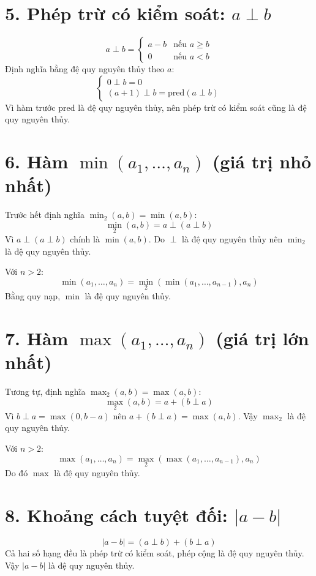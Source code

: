 \documentclass[12pt,a4paper]{article}
\begin{document}
\section*{5. Phép trừ có kiểm soát: $a \perp b$}

\[
a \perp b = 
\begin{cases}
a - b & \text{nếu } a \ge b \\
0 & \text{nếu } a < b
\end{cases}
\]
Định nghĩa bằng đệ quy nguyên thủy theo $a$:
\[
\begin{cases}
0 \perp b = 0 \\
(a+1) \perp b = \mathrm{pred}(a \perp b)
\end{cases}
\]
Vì hàm trước $\mathrm{pred}$ là đệ quy nguyên thủy, nên phép trừ có kiểm soát cũng là đệ quy nguyên thủy.

\section*{6. Hàm $\min(a_1, \dots, a_n)$ (giá trị nhỏ nhất)}

Trước hết định nghĩa $\min_2(a,b) = \min(a,b)$:
\[
\min_2(a,b) = a \perp (a \perp b)
\]
Vì $a \perp (a \perp b)$ chính là $\min(a,b)$. Do $\perp$ là đệ quy nguyên thủy nên $\min_2$ là đệ quy nguyên thủy.

Với $n > 2$:
\[
\min(a_1, \dots, a_n) = \min_2(\min(a_1, \dots, a_{n-1}), a_n)
\]
Bằng quy nạp, $\min$ là đệ quy nguyên thủy.

\section*{7. Hàm $\max(a_1, \dots, a_n)$ (giá trị lớn nhất)}

Tương tự, định nghĩa $\max_2(a,b) = \max(a,b)$:
\[
\max_2(a,b) = a + (b \perp a)
\]
Vì $b \perp a = \max(0, b-a)$ nên $a + (b \perp a) = \max(a,b)$. Vậy $\max_2$ là đệ quy nguyên thủy.

Với $n > 2$:
\[
\max(a_1, \dots, a_n) = \max_2(\max(a_1, \dots, a_{n-1}), a_n)
\]
Do đó $\max$ là đệ quy nguyên thủy.

\section*{8. Khoảng cách tuyệt đối: $|a - b|$}

\[
|a - b| = (a \perp b) + (b \perp a)
\]
Cả hai số hạng đều là phép trừ có kiểm soát, phép cộng là đệ quy nguyên thủy. Vậy $|a-b|$ là đệ quy nguyên thủy.
\end{document}
